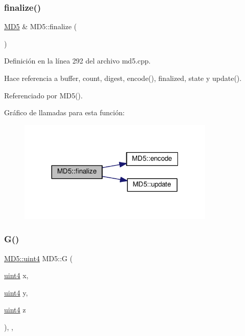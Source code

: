 \subsubsection{\texorpdfstring{finalize()}{finalize()}}
{\footnotesize\ttfamily \hyperlink{classMD5}{M\+D5} \& M\+D5\+::finalize (\begin{DoxyParamCaption}{ }\end{DoxyParamCaption})}



Definición en la línea 292 del archivo md5.\+cpp.



Hace referencia a buffer, count, digest, encode(), finalized, state y update().



Referenciado por M\+D5().

Gráfico de llamadas para esta función\+:\nopagebreak
\begin{figure}[H]
\begin{center}
\leavevmode
\includegraphics[width=265pt]{classMD5_a10f607494a3f2e3e515fc4b99d1a06cc_cgraph}
\end{center}
\end{figure}
\hypertarget{classMD5_afbc3ab3591fca4e780f647dac3952bc8}{}\label{classMD5_afbc3ab3591fca4e780f647dac3952bc8} 
\subsubsection{\texorpdfstring{G()}{G()}}
{\footnotesize\ttfamily \hyperlink{classMD5_a2e5b84a3d7db292f49873061214a0444}{M\+D5\+::uint4} M\+D5\+::G (\begin{DoxyParamCaption}\item[{\hyperlink{classMD5_a2e5b84a3d7db292f49873061214a0444}{uint4}}]{x,  }\item[{\hyperlink{classMD5_a2e5b84a3d7db292f49873061214a0444}{uint4}}]{y,  }\item[{\hyperlink{classMD5_a2e5b84a3d7db292f49873061214a0444}{uint4}}]{z }\end{DoxyParamCaption})\hspace{0.3cm}{\ttfamily [inline]}, {\ttfamily [static]}, {\ttfamily [private]}}



